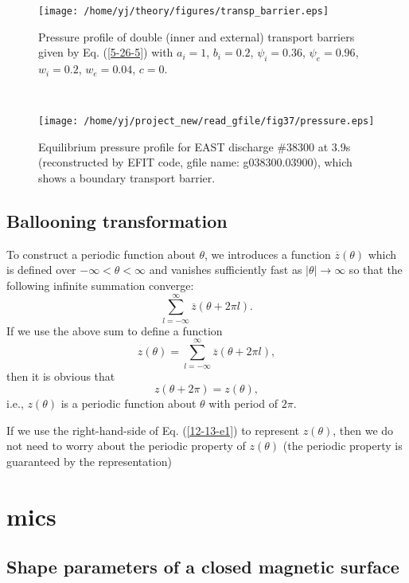 \documentclass{llncs}
\begin{document}
\begin{figure}[h]
  \texttt{[image: /home/yj/theory/figures/transp\_barrier.eps]}
  \caption{Pressure profile of double (inner and external) transport barriers
  given by Eq. (\ref{5-26-5}) with $a_i = 1$, $b_i = 0.2$, $\psi_i = 0.36$,
  $\psi_e = 0.96$, $w_i = 0.2$, $w_e = 0.04$, $c = 0$.}
\end{figure}

\

\begin{figure}[h]
  \texttt{[image: /home/yj/project\_new/read\_gfile/fig37/pressure.eps]}
  \caption{Equilibrium pressure profile for EAST discharge \#38300 at 3.9s
  (reconstructed by EFIT code, gfile name: g038300.03900), which shows a
  boundary transport barrier.}
\end{figure}

\subsection{Ballooning transformation}

To construct a periodic function about $\theta$, we introduces a function
$\overline{z} (\theta)$ which is defined over $- \infty < \theta < \infty$ and
vanishes sufficiently fast as $| \theta | \rightarrow \infty$ so that the
following infinite summation converge:
\begin{equation}
  \sum_{l = - \infty}^{\infty} \overline{z} (\theta + 2 \pi l) .
\end{equation}
If we use the above sum to define a function
\begin{equation}
  \label{12-13-e1} z (\theta) = \sum_{l = - \infty}^{\infty} \overline{z}
  (\theta + 2 \pi l),
\end{equation}
then it is obvious that
\begin{equation}
  z (\theta + 2 \pi) = z (\theta),
\end{equation}
i.e., $z (\theta)$ is a periodic function about $\theta$ with period of $2
\pi$.

If we use the right-hand-side of Eq. (\ref{12-13-e1}) to represent $z
(\theta)$, then we do not need to worry about the periodic property of $z
(\theta)$ (the periodic property is guaranteed by the representation)

\appendix\section{mics}

\subsection{Shape parameters of a closed magnetic surface}
\end{document}
